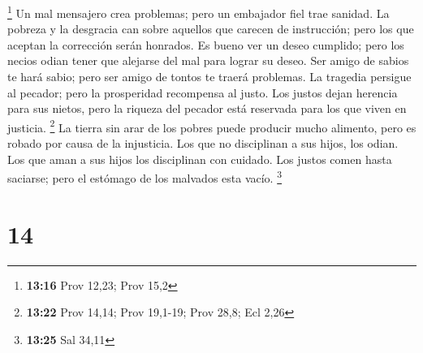 \footnote{\textbf{13:16} Prov 12,23; Prov 15,2}  Un mal
mensajero crea problemas; pero un embajador fiel trae sanidad.
 La pobreza y la desgracia can sobre aquellos que carecen
de instrucción; pero los que aceptan la corrección serán honrados.
 Es bueno ver un deseo cumplido; pero los necios odian
tener que alejarse del mal para lograr su deseo.  Ser amigo
de sabios te hará sabio; pero ser amigo de tontos te traerá problemas.
 La tragedia persigue al pecador; pero la prosperidad
recompensa al justo.  Los justos dejan herencia para sus
nietos, pero la riqueza del pecador está reservada para los que viven en
justicia. \footnote{\textbf{13:22} Prov 14,14; Prov 19,1-19; Prov 28,8;
  Ecl 2,26}  La tierra sin arar de los pobres puede
producir mucho alimento, pero es robado por causa de la injusticia.
 Los que no disciplinan a sus hijos, los odian. Los que
aman a sus hijos los disciplinan con cuidado.  Los justos
comen hasta saciarse; pero el estómago de los malvados esta vacío.
\footnote{\textbf{13:25} Sal 34,11}

\hypertarget{section-13}{%
\section{14}\label{section-13}}

